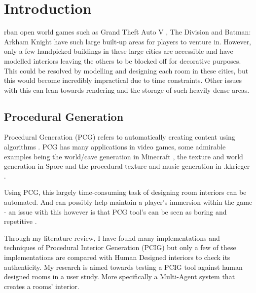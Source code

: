 \section{Introduction}
rban open world games such as Grand Theft Auto V \cite{game:gta}, The Division \cite{game:division} and Batman: Arkham Knight \cite{game:arkham-knight} have such large built-up areas for players to venture in. However, only a few handpicked buildings in these large cities are accessible and have  modelled interiors leaving the others to be blocked off for decorative purposes. This could be resolved by modelling and designing each room in these cities, but this would become incredibly impractical due to time constraints. Other issues with this can lean towards rendering and the storage of such heavily dense areas.

\subsection*{Procedural Generation}
Procedural Generation (PCG) refers to automatically creating content using algorithms \cite{what-is-pcg}. PCG has many applications in video games, some admirable examples being the world/cave generation in Minecraft \cite{game:minecraft}, the texture\cite{game:spore-texture} and world generation\cite{game:spore-world} in Spore \cite{game:spore} and the procedural texture and music generation in .kkrieger \cite{game:kkreiger}.

Using PCG, this largely time-consuming task of designing room interiors can be automated. And can possibly help maintain a player's immersion within the game - an issue with this however is that PCG tool's can be seen as boring and repetitive \cite[Chapter~2]{pcg_in_gd}.

Through my literature review, I have found many implementations and techniques of Procedural Interior Generation (PCIG) but only a few of these implementations are compared with Human Designed interiors to check its authenticity. My research is aimed towards testing a PCIG tool against human designed rooms in a user study. More specifically a Multi-Agent system that creates a rooms' interior.

